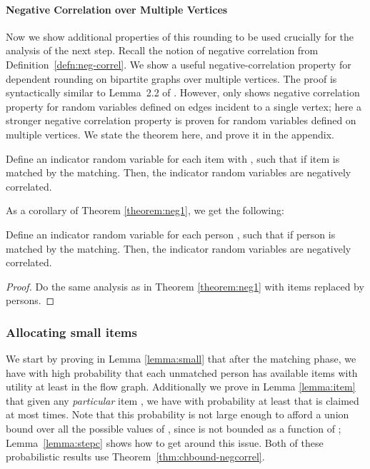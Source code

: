\paragraph*{Negative Correlation over Multiple Vertices} 
Now we show additional properties of this rounding to be used crucially for the analysis of the next step.
Recall the notion of negative correlation from Definition~\ref{defn:neg-correl}.
We show a useful negative-correlation property for dependent rounding on bipartite graphs over multiple vertices. The proof is syntactically similar to Lemma~2.2 of \cite{gkps:dep-round}. However, \cite{gkps:dep-round} only shows negative correlation property for random variables defined on edges incident to a single vertex; here a stronger negative correlation property is proven for random variables defined on multiple vertices. We state the theorem here, and prove it in the appendix. 



\begin{theorem}
\label{theorem:neg1}
Define an indicator random variable  for each item  with , such that 
 if item  is matched by the matching. Then, the indicator random variables  are negatively correlated.
 \end{theorem}



 As a corollary of Theorem \ref{theorem:neg1}, we get the following:
 \begin{corollary}
\label{cor:neg2}
Define an indicator random variable  for each person , such that 
 if person  is matched by the matching. Then, the indicator random variables  are negatively correlated.
 \end{corollary}

\begin{proof}
Do the same analysis as in Theorem \ref{theorem:neg1} with items replaced by persons.
\end{proof}


\subsubsection{Allocating small items}
\label{subsec:alloc}

We start by proving in Lemma \ref{lemma:small} that after the matching phase, we have with high probability that
each unmatched person has available items with utility at least  in the flow graph. Additionally we prove in Lemma  \ref{lemma:item} that given any \emph{particular} item , we have with probability at least  that  is claimed at most
 times. Note that this probability is not large enough to afford a union bound over all the  possible values of , since  is not
bounded as a function of ; Lemma~\ref{lemma:stepc} shows how to get around this issue. Both of these probabilistic results use
Theorem~\ref{thm:chbound-negcorrel}.



